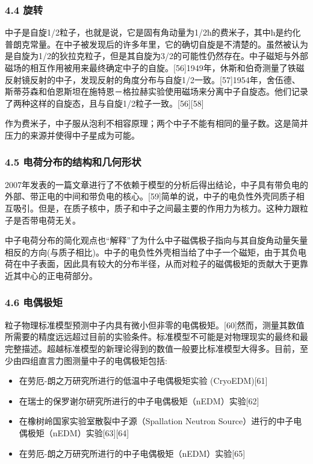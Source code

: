 \subsubsection{4.4 旋转}
中子是自旋1/2粒子，也就是说，它是固有角动量为1/2ħ的费米子，其中ħ是约化普朗克常量。在中子被发现后的许多年里，它的确切自旋是不清楚的。虽然被认为是自旋为1/2的狄拉克粒子，但是其自旋为3/2的可能性仍然存在。中子磁矩与外部磁场的相互作用被用来最终确定中子的自旋。[56]1949年，休斯和伯奇测量了铁磁反射镜反射的中子，发现反射的角度分布与自旋1/2一致。[57]1954年，舍伍德、斯蒂芬森和伯恩斯坦在施特恩－格拉赫实验使用磁场来分离中子自旋态。他们记录了两种这样的自旋态，且与自旋1/2粒子一致。[56][58]

作为费米子，中子服从泡利不相容原理；两个中子不能有相同的量子数。这是简并压力的来源并使得中子星成为可能。

\subsubsection{4.5 电荷分布的结构和几何形状}
2007年发表的一篇文章进行了不依赖于模型的分析后得出结论，中子具有带负电的外部、带正电的中间和带负电的核心。[59]简单的说，中子的电负性外壳同质子相互吸引。但是，在质子核中，质子和中子之间最主要的作用力为核力。这种力跟粒子是否带电荷无关。

中子电荷分布的简化观点也“解释”了为什么中子磁偶极子指向与其自旋角动量矢量相反的方向(与质子相比)。中子的电负性外壳相当给了中子一个磁矩，由于其负电荷在中子表面，因此具有较大的分布半径，从而对粒子的磁偶极矩的贡献大于更靠近其中心的正电荷部分。

\subsubsection{4.6 电偶极矩}
粒子物理标准模型预测中子内具有微小但非零的电偶极矩。[60]然而，测量其数值所需要的精度远远超过目前的实验条件。标准模型不可能是对物理现实的最终和最完整描述。超越标准模型的新理论得到的数值一般要比标准模型大得多。目前，至少由四组直言力图测量中子的电偶极矩包括:
\begin{itemize}
\item 在劳厄-朗之万研究所进行的低温中子电偶极矩实验 (CryoEDM)[61]
\item 在瑞士的保罗谢尔研究所进行的中子电偶极矩（nEDM）实验[62]
\item 在橡树岭国家实验室散裂中子源（Spallation Neutron Source）进行的中子电偶极矩（nEDM）实验[63][64]
\item 在劳厄-朗之万研究所进行的中子电偶极矩（nEDM）实验[65]
\end{itemize}

